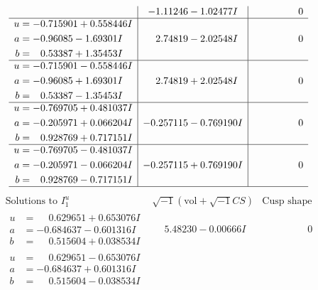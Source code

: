 \documentclass[1p]{elsarticle_modified}
\theoremstyle{definition}
\newcommand{\I}{\sqrt{-1}}
\begin{document}
$$\begin{array}{c|c|c}
 & -1.11246 - 1.02477 I & \phantom{-0.000000 } 0 \\ \hline\begin{aligned}
u &= -0.715901 + 0.558446 I \\
a &= -0.96085 - 1.69301 I \\
b &= \phantom{-}0.53387 + 1.35453 I\end{aligned}
 & \phantom{-}2.74819 - 2.02548 I & \phantom{-0.000000 } 0 \\ \hline\begin{aligned}
u &= -0.715901 - 0.558446 I \\
a &= -0.96085 + 1.69301 I \\
b &= \phantom{-}0.53387 - 1.35453 I\end{aligned}
 & \phantom{-}2.74819 + 2.02548 I & \phantom{-0.000000 } 0 \\ \hline\begin{aligned}
u &= -0.769705 + 0.481037 I \\
a &= -0.205971 + 0.066204 I \\
b &= \phantom{-}0.928769 + 0.717151 I\end{aligned}
 & -0.257115 - 0.769190 I & \phantom{-0.000000 } 0 \\ \hline\begin{aligned}
u &= -0.769705 - 0.481037 I \\
a &= -0.205971 - 0.066204 I \\
b &= \phantom{-}0.928769 - 0.717151 I\end{aligned}
 & -0.257115 + 0.769190 I & \phantom{-0.000000 } 0\\
 \hline 
 \end{array}$$\newpage$$\begin{array}{c|c|c}  
\text{Solutions to }I^u_{1}& \I (\text{vol} + \sqrt{-1}CS) & \text{Cusp shape}\\
 \hline 
\begin{aligned}
u &= \phantom{-}0.629651 + 0.653076 I \\
a &= -0.684637 - 0.601316 I \\
b &= \phantom{-}0.515604 + 0.038534 I\end{aligned}
 & \phantom{-}5.48230 - 0.00666 I & \phantom{-0.000000 } 0 \\ \hline\begin{aligned}
u &= \phantom{-}0.629651 - 0.653076 I \\
a &= -0.684637 + 0.601316 I \\
b &= \phantom{-}0.515604 - 0.038534 I\end{aligned}

\end{array}$$
\end{document}
